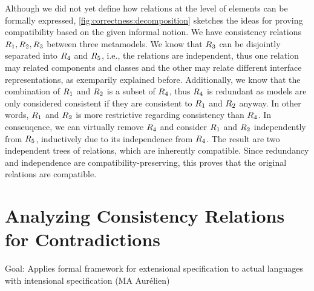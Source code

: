 Although we did not yet define how relations at the level of elements can be formally expressed, \autoref{fig:correctness:decomposition} sketches the ideas for proving compatibility based on the given informal notion.
We have consistency relations $R_{1}, R_{2}, R_{3}$ between three metamodels.
We know that $R_{3}$ can be disjointly separated into $R_{4}$ and $R_{5}$, i.e., the relations are independent, thus one relation may related components and classes and the other may relate different interface representations, as exemparily explained before.
Additionally, we know that the combination of $R_{1}$ and $R_{2}$ is a subset of $R_{4}$, thus $R_{4}$ is redundant as models are only considered consistent if they are consistent to $R_{1}$ and $R_{2}$ anyway.
In other words, $R_{1}$ and $R_{2}$ is more restrictive regarding consistency than $R_{4}$.
In conseuqence, we can virtually remove $R_{4}$ and consider $R_{1}$ and $R_{2}$ independently from $R_{5}$, inductively due to its independence from $R_{4}$.
The result are two independent trees of relations, which are inherently compatible.
Since redundancy and independence are compatibility-preserving, this proves that the original relations are compatible.



\section{Analyzing Consistency Relations for Contradictions}
Goal: Applies formal framework for extensional specification to actual languages with intensional specification (MA Aurélien)


